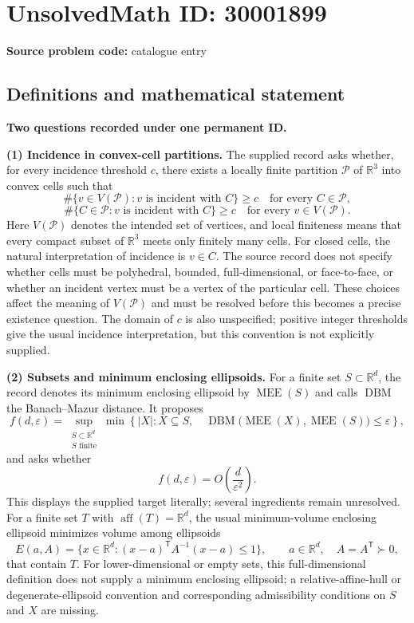 \documentclass[11pt]{article}
\newcommand{\R}{\mathbb{R}}
\begin{document}
\section*{UnsolvedMath ID: 30001899}
\textbf{Source problem code:} catalogue entry
\subsection{Definitions and mathematical statement}
\textbf{Two questions recorded under one permanent ID.}

\textbf{(1) Incidence in convex-cell partitions.} The supplied record asks whether, for every incidence threshold \(c\), there exists a locally finite partition \(\mathcal P\) of \(\R^3\) into convex cells such that
\[
\#\{v\in V(\mathcal P):v\text{ is incident with }C\}\ge c
\quad\text{for every }C\in\mathcal P,
\]
\[
\#\{C\in\mathcal P:v\text{ is incident with }C\}\ge c
\quad\text{for every }v\in V(\mathcal P).
\]
Here \(V(\mathcal P)\) denotes the intended set of vertices, and local finiteness means that every compact subset of \(\R^3\) meets only finitely many cells. For closed cells, the natural interpretation of incidence is \(v\in C\). The source record does not specify whether cells must be polyhedral, bounded, full-dimensional, or face-to-face, or whether an incident vertex must be a vertex of the particular cell. These choices affect the meaning of \(V(\mathcal P)\) and must be resolved before this becomes a precise existence question. The domain of \(c\) is also unspecified; positive integer thresholds give the usual incidence interpretation, but this convention is not explicitly supplied.

\textbf{(2) Subsets and minimum enclosing ellipsoids.} For a finite set \(S\subset\R^d\), the record denotes its minimum enclosing ellipsoid by \(\operatorname{MEE}(S)\) and calls \(\operatorname{DBM}\) the Banach--Mazur distance. It proposes
\[
f(d,\varepsilon)=
\sup_{\substack{S\subset\R^d\\S\text{ finite}}}
\min\left\{|X|:X\subseteq S,\quad
\operatorname{DBM}\bigl(\operatorname{MEE}(X),\operatorname{MEE}(S)\bigr)
\le\varepsilon\right\},
\]
and asks whether
\[
f(d,\varepsilon)=O\!\left(\frac{d}{\varepsilon^2}\right).
\]
This displays the supplied target literally; several ingredients remain unresolved. For a finite set \(T\) with \(\operatorname{aff}(T)=\R^d\), the usual minimum-volume enclosing ellipsoid minimizes volume among ellipsoids
\[
E(a,A)=\{x\in\R^d:(x-a)^{\mathsf T}A^{-1}(x-a)\le1\},
\qquad a\in\R^d,\quad A=A^{\mathsf T}\succ0,
\]
that contain \(T\). For lower-dimensional or empty sets, this full-dimensional definition does not supply a minimum enclosing ellipsoid; a relative-affine-hull or degenerate-ellipsoid convention and corresponding admissibility conditions on \(S\) and \(X\) are missing.
\end{document}
